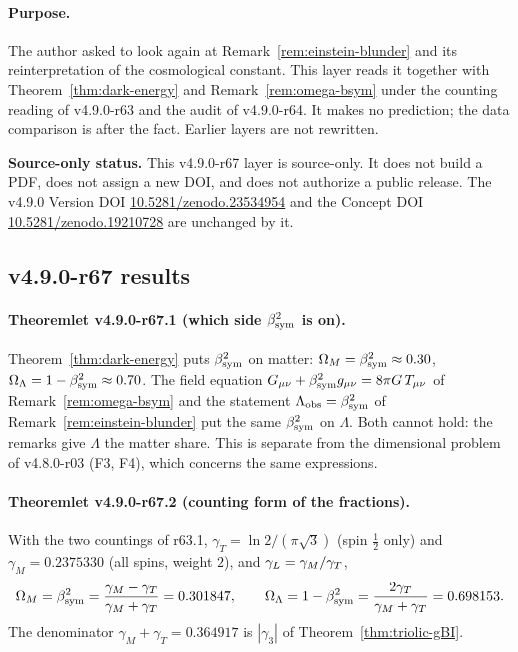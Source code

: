 \paragraph{Purpose.}
The author asked to look again at Remark~\ref{rem:einstein-blunder} and its reinterpretation of the cosmological constant.  This layer reads it together with
Theorem~\ref{thm:dark-energy} and Remark~\ref{rem:omega-bsym} under the counting reading of v4.9.0-r63 and the audit of v4.9.0-r64.  It makes no prediction; the
data comparison is after the fact.  Earlier layers are not rewritten.

\noindent\textbf{Source-only status.}
This v4.9.0-r67 layer is source-only.  It does not build a PDF, does not assign a new DOI,
and does not authorize a public release.  The v4.9.0 Version DOI
\href{https://doi.org/10.5281/zenodo.23534954}{10.5281/zenodo.23534954} and the Concept DOI
\href{https://doi.org/10.5281/zenodo.19210728}{10.5281/zenodo.19210728} are unchanged by it.

\subsection*{v4.9.0-r67 results}
\label{subsec:v490-r67-results}

\paragraph{Theoremlet v4.9.0-r67.1 (which side \texorpdfstring{$\beta_{\mathrm{sym}}^2$}{beta squared} is on).}
Theorem~\ref{thm:dark-energy} puts \(\beta_{\mathrm{sym}}^2\) on matter: \(\Omega_M=\beta_{\mathrm{sym}}^2\approx0.30\), \(\Omega_\Lambda=1-\beta_{\mathrm{sym}}^2\approx0.70\).  The field equation
\(G_{\mu\nu}+\beta_{\mathrm{sym}}^2g_{\mu\nu}=8\pi G\,T_{\mu\nu}\) of Remark~\ref{rem:omega-bsym} and the statement \(\Lambda_{\mathrm{obs}}=\beta_{\mathrm{sym}}^2\) of
Remark~\ref{rem:einstein-blunder} put the same \(\beta_{\mathrm{sym}}^2\) on \(\Lambda\).  Both cannot hold: the remarks give \(\Lambda\) the matter share.  This is separate
from the dimensional problem of v4.8.0-r03 (F3, F4), which concerns the same expressions.

\paragraph{Theoremlet v4.9.0-r67.2 (counting form of the fractions).}
With the two countings of r63.1, \(\gamma_T=\ln2/(\pi\sqrt3)\) (spin \(\tfrac12\) only) and \(\gamma_M=0.2375330\) (all spins, weight \(2\)), and
\(\gamma_L=\gamma_M/\gamma_T\),
\[
\Omega_M=\beta_{\mathrm{sym}}^2=\frac{\gamma_M-\gamma_T}{\gamma_M+\gamma_T}=0.301847,
\qquad
\Omega_\Lambda=1-\beta_{\mathrm{sym}}^2=\frac{2\gamma_T}{\gamma_M+\gamma_T}=0.698153 .
\]
The denominator \(\gamma_M+\gamma_T=0.364917\) is \(|\gamma_3|\) of Theorem~\ref{thm:triolic-gBI}.

